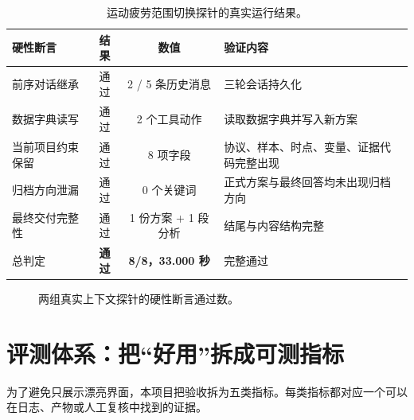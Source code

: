 \documentclass[11pt,a4paper]{article}
\begin{document}
\begin{table}[htbp]
\centering
\small
\begin{tabularx}{\linewidth}{@{}YccY@{}}
\toprule
硬性断言 & 结果 & 数值 & 验证内容 \\
\midrule
前序对话继承 & 通过 & 2 / 5 条历史消息 & 三轮会话持久化 \\
数据字典读写 & 通过 & 2 个工具动作 & 读取数据字典并写入新方案 \\
当前项目约束保留 & 通过 & 8 项字段 & 协议、样本、时点、变量、证据代码完整出现 \\
归档方向泄漏 & 通过 & 0 个关键词 & 正式方案与最终回答均未出现归档方向 \\
最终交付完整性 & 通过 & 1 份方案 + 1 段分析 & 结尾与内容结构完整 \\
总判定 & \textbf{通过} & \textbf{8/8，33.000 秒} & 完整通过 \\
\bottomrule
\end{tabularx}
\caption{运动疲劳范围切换探针的真实运行结果。}
\end{table}

\begin{figure}[htbp]
\centering
{}
\caption{两组真实上下文探针的硬性断言通过数。}
\end{figure}

\section{评测体系：把“好用”拆成可测指标}
为了避免只展示漂亮界面，本项目把验收拆为五类指标。每类指标都对应一个可以在日志、产物或人工复核中找到的证据。
\end{document}
